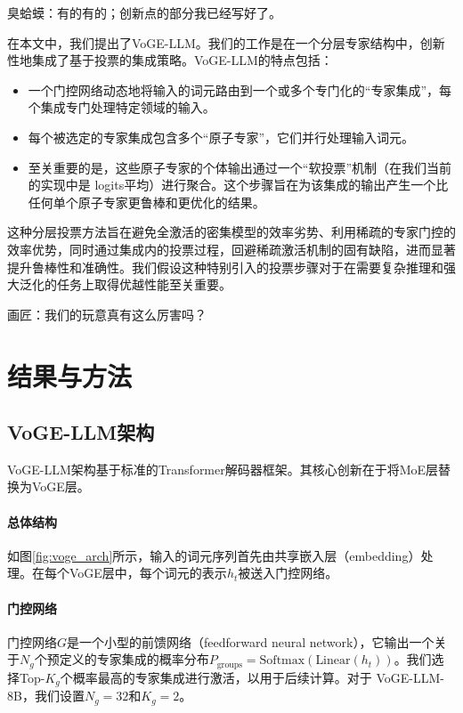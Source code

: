 {\kaiti 臭蛤蟆：有的有的；创新点的部分我已经写好了。}

在本文中，我们提出了VoGE-LLM。我们的工作是在一个分层专家结构中，创新性地集成了基于投票的集成策略。VoGE-LLM的特点包括：
\begin{itemize}[nosep]
\item{} 一个门控网络动态地将输入的词元路由到一个或多个专门化的“专家集成”，每个集成专门处理特定领域的输入。
\item{} 每个被选定的专家集成包含多个“原子专家”，它们并行处理输入词元。
\item{} 至关重要的是，这些原子专家的个体输出通过一个“软投票”机制（在我们当前的实现中是 logits平均）进行聚合。这个步骤旨在为该集成的输出产生一个比任何单个原子专家更鲁棒和更优化的结果。
\end{itemize}
这种分层投票方法旨在避免全激活的密集模型的效率劣势、利用稀疏的专家门控的效率优势，同时通过集成内的投票过程，回避稀疏激活机制的固有缺陷，进而显著提升鲁棒性和准确性。我们假设这种特别引入的投票步骤对于在需要复杂推理和强大泛化的任务上取得优越性能至关重要。

{\kaiti 画匠：我们的玩意真有这么厉害吗？}

\section{结果与方法}

\subsection{VoGE-LLM架构}
VoGE-LLM架构基于标准的Transformer解码器框架。其核心创新在于将MoE层替换为VoGE层。

\paragraph{总体结构}
如图\ref{fig:voge_arch}所示，输入的词元序列首先由共享嵌入层（embedding）处理。在每个VoGE层中，每个词元的表示\(h_t\)被送入门控网络。

\paragraph{门控网络}
门控网络\(G\)是一个小型的前馈网络（feedforward neural network），它输出一个关于\(N_g\)个预定义的专家集成的概率分布\(P_\text{groups} = \text{Softmax}(\text{Linear}(h_t))\)。我们选择Top-$K_g$个概率最高的专家集成进行激活，以用于后续计算。对于 VoGE-LLM-8B，我们设置\(N_g=32\)和\(K_g=2\)。

